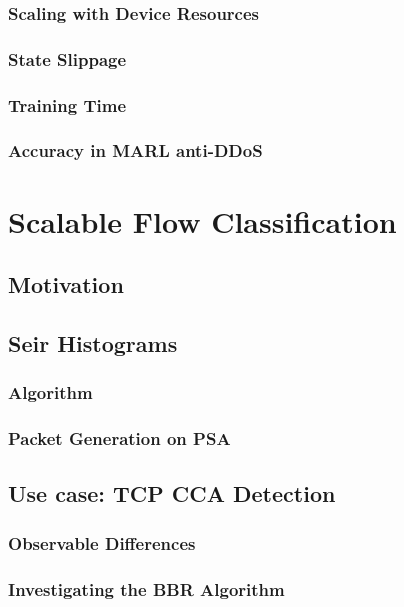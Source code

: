 \documentclass[twoside,hidelinks]{glasgowthesis}
\begin{document}
\subsection{Scaling with Device Resources}
\subsection{State Slippage}
\subsection{Training Time}
\subsection{Accuracy in MARL anti-DDoS}



\chapter{Scalable Flow Classification}
\section{Motivation}
\section{Sei\dh{}r Histograms}
\subsection{Algorithm}
\subsection{Packet Generation on PSA}
\section{Use case: TCP CCA Detection}
\subsection{Observable Differences}
\subsection{Investigating the BBR Algorithm}
\end{document}
